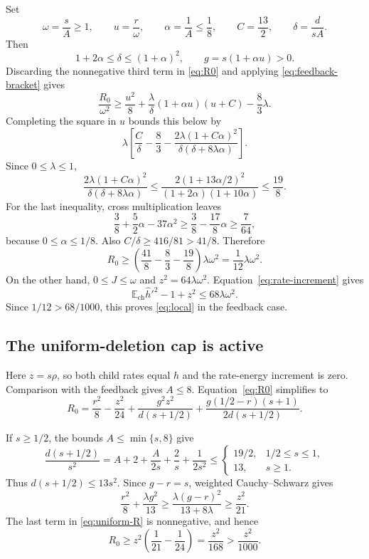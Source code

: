 \documentclass[11pt]{article}
\numberwithin{equation}{section}
\theoremstyle{remark}
\newcommand{\E}{\mathbb E}
\begin{document}
Set
\[
\omega=\frac sA\ge1,\qquad
u=\frac r\omega,\qquad
\alpha=\frac1A\le\frac18,\qquad
C=\frac{13}{2},\qquad
\delta=\frac d{sA}.
\]
Then
\[
1+2\alpha\le\delta\le(1+\alpha)^2,
\qquad
g=s(1+\alpha u)>0.
\]
Discarding the nonnegative third term in \eqref{eq:R0} and applying
\eqref{eq:feedback-bracket} gives
\[
\frac{R_0}{\omega^2}
\ge\frac{u^2}{8}
+\frac{\lambda}{\delta}(1+\alpha u)(u+C)
-\frac83\lambda.
\]
Completing the square in \(u\) bounds this below by
\begin{equation}\label{eq:feedback-square}
\lambda\left[
\frac C\delta-\frac83-
\frac{2\lambda(1+C\alpha)^2}
{\delta(\delta+8\lambda\alpha)}
\right].
\end{equation}
Since \(0\le\lambda\le1\),
\[
\frac{2\lambda(1+C\alpha)^2}
{\delta(\delta+8\lambda\alpha)}
\le\frac{2(1+13\alpha/2)^2}{(1+2\alpha)(1+10\alpha)}
\le\frac{19}{8}.
\]
For the last inequality, cross multiplication leaves
\[
\frac38+\frac52\alpha-37\alpha^2
\ge\frac38-\frac{17}{8}\alpha\ge\frac7{64},
\]
because \(0\le\alpha\le1/8\). Also
\(C/\delta\ge416/81>41/8\). Therefore
\begin{equation}\label{eq:feedback-R}
R_0\ge\left(\frac{41}{8}-\frac83-\frac{19}{8}\right)
\lambda\omega^2=\frac1{12}\lambda\omega^2.
\end{equation}
On the other hand, \(0\le J\le\omega\) and
\(z^2=64\lambda\omega^2\). Equation~\eqref{eq:rate-increment} gives
\[
\E_{\mathrm{ch}}\widehat h'^2-1+z^2
\le68\lambda\omega^2.
\]
Since \(1/12>68/1000\), this proves \eqref{eq:local} in the feedback case.

\subsection{The uniform-deletion cap is active}

Here \(z=s\rho\), so both child rates equal \(h\) and the rate-energy
increment is zero. Comparison with the feedback gives \(A\le8\).
Equation~\eqref{eq:R0} simplifies to
\begin{equation}\label{eq:uniform-R}
R_0=\frac{r^2}{8}-\frac{z^2}{24}
+\frac{g^2z^2}{d(s+1/2)}
+\frac{g(1/2-r)(s+1)}{2d(s+1/2)}.
\end{equation}

If \(s\ge1/2\), the bounds \(A\le\min\{s,8\}\) give
\[
\frac{d(s+1/2)}{s^2}
=A+2+\frac{A}{2s}+\frac2s+\frac1{2s^2}
\le
\begin{cases}
19/2,&1/2\le s\le1,\\
13,&s\ge1.
\end{cases}
\]
Thus \(d(s+1/2)\le13s^2\). Since \(g-r=s\), weighted
Cauchy--Schwarz gives
\[
\frac{r^2}{8}+\frac{\lambda g^2}{13}
\ge\frac{\lambda(g-r)^2}{13+8\lambda}
\ge\frac{z^2}{21}.
\]
The last term in \eqref{eq:uniform-R} is nonnegative, and hence
\[
R_0\ge z^2\left(\frac1{21}-\frac1{24}\right)
=\frac{z^2}{168}>\frac{z^2}{1000}.
\]
\end{document}
